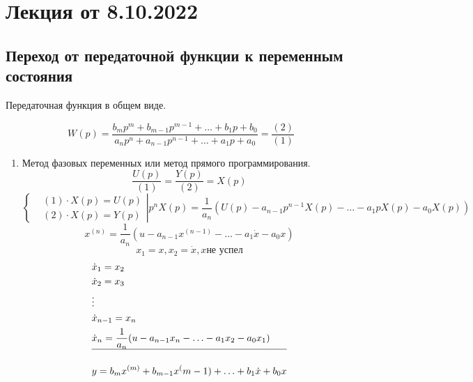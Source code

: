 \section{Лекция от 8.10.2022}
\subsection{Переход от передаточной функции к переменным состояния}
Передаточная функция в общем виде.\par
\[W(p) = \frac{b_mp^m + b_{m-1}p^{m-1} + \ldots + b_1p + b_0}
{a_np^n + a_{n-1}p^{n-1} + \ldots + a_1p +a_0} = \frac{(2)}{(1)}\]
\begin{enumerate}
	\item Метод фазовых переменных или метод прямого программирования.
		\begin{equation}\frac{U(p)}{(1)} = \frac{Y(p)}{(2)} = X(p)\end{equation}
		\[\left\{\begin{aligned} 
				&(1)\cdot X(p) = U(p)\\
				&(2) \cdot X(p) = Y(p)
				    \end{aligned}\right| p^nX(p) = \frac{1}{a_n}(U(p) - a_{n-1}p^{n-1}X(p) - \ldots - a_1pX(p) - a_0X(p))\]
		\[x^{(n)} = \frac{1}{a_n}(u - a_{n-1}x^{(n-1)} - \ldots - a_1 \dot x - a_0x)\]
		\[x_1 = x, x_2 = \dot x, x \text{не успел}\]
		\[\begin{aligned} 
			&\dot x_1 = x_2\\
			&\dot x_2 = x_3\\
			&\vdots\\
			&\dot x_{n-1} = x_n\\
			&\dot x_n = \frac{1}{a_n}(u - a_{n-1}x_n - \ldots - a_1x_2 - a_0x_1)\\
			\hline\\
			&y =  b_mx^{(m)} + b_{m-1}x^(m-1) + \ldots + b_1\dot x + b_0x
		\end{aligned}\]


\end{enumerate}
